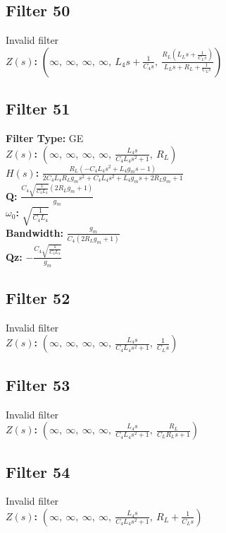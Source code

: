 \documentclass{article}
\begin{document}
\subsection*{Filter 50}
Invalid filter \\ 
\textbf{$Z(s)$:} $\left( \infty, \  \infty, \  \infty, \  \infty, \  L_{4} s + \frac{1}{C_{4} s}, \  \frac{R_{L} \left(L_{L} s + \frac{1}{C_{L} s}\right)}{L_{L} s + R_{L} + \frac{1}{C_{L} s}}\right)$ \\ 
\subsection*{Filter 51}
\textbf{Filter Type:} GE \\ 
\textbf{$Z(s)$:} $\left( \infty, \  \infty, \  \infty, \  \infty, \  \frac{L_{4} s}{C_{4} L_{4} s^{2} + 1}, \  R_{L}\right)$ \\ 
\textbf{$H(s)$:} $\frac{R_{L} \left(- C_{4} L_{4} s^{2} + L_{4} g_{m} s - 1\right)}{2 C_{4} L_{4} R_{L} g_{m} s^{2} + C_{4} L_{4} s^{2} + L_{4} g_{m} s + 2 R_{L} g_{m} + 1}$ \\ 
\textbf{Q:} $\frac{C_{4} \sqrt{\frac{1}{C_{4} L_{4}}} \left(2 R_{L} g_{m} + 1\right)}{g_{m}}$ \\ 
\textbf{$\omega_0$:} $\sqrt{\frac{1}{C_{4} L_{4}}}$ \\ 
\textbf{Bandwidth:} $\frac{g_{m}}{C_{4} \left(2 R_{L} g_{m} + 1\right)}$ \\ 
\textbf{Qz:} $- \frac{C_{4} \sqrt{\frac{1}{C_{4} L_{4}}}}{g_{m}}$ \\ 
\subsection*{Filter 52}
Invalid filter \\ 
\textbf{$Z(s)$:} $\left( \infty, \  \infty, \  \infty, \  \infty, \  \frac{L_{4} s}{C_{4} L_{4} s^{2} + 1}, \  \frac{1}{C_{L} s}\right)$ \\ 
\subsection*{Filter 53}
Invalid filter \\ 
\textbf{$Z(s)$:} $\left( \infty, \  \infty, \  \infty, \  \infty, \  \frac{L_{4} s}{C_{4} L_{4} s^{2} + 1}, \  \frac{R_{L}}{C_{L} R_{L} s + 1}\right)$ \\ 
\subsection*{Filter 54}
Invalid filter \\ 
\textbf{$Z(s)$:} $\left( \infty, \  \infty, \  \infty, \  \infty, \  \frac{L_{4} s}{C_{4} L_{4} s^{2} + 1}, \  R_{L} + \frac{1}{C_{L} s}\right)$ \\ 
\end{document}

